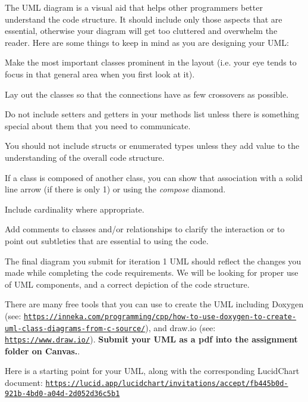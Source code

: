 The U\+ML diagram is a visual aid that helps other programmers better understand the code structure. It should include only those aspects that are essential, otherwise your diagram will get too cluttered and overwhelm the reader. Here are some things to keep in mind as you are designing your U\+ML\+:


\begin{DoxyItemize}
\item Make the most important classes prominent in the layout (i.\+e. your eye tends to focus in that general area when you first look at it).
\item Lay out the classes so that the connections have as few crossovers as possible.
\item Do not include setters and getters in your methods list unless there is something special about them that you need to communicate.
\item You should not include structs or enumerated types unless they add value to the understanding of the overall code structure.
\item If a class is composed of another class, you can show that association with a solid line arrow (if there is only 1) or using the {\itshape compose} diamond.
\item Include cardinality where appropriate.
\item Add comments to classes and/or relationships to clarify the interaction or to point out subtleties that are essential to using the code.
\end{DoxyItemize}

The final diagram you submit for iteration 1 U\+ML should reflect the changes you made while completing the code requirements. We will be looking for proper use of U\+ML components, and a correct depiction of the code structure.

There are many free tools that you can use to create the U\+ML including Doxygen (see\+: \href{https://inneka.com/programming/cpp/how-to-use-doxygen-to-create-uml-class-diagrams-from-c-source/}{\tt https\+://inneka.\+com/programming/cpp/how-\/to-\/use-\/doxygen-\/to-\/create-\/uml-\/class-\/diagrams-\/from-\/c-\/source/}), and draw.\+io (see\+: \href{https://www.draw.io/}{\tt https\+://www.\+draw.\+io/}). {\bfseries Submit your U\+ML as a pdf into the assignment folder on Canvas.}.

Here is a starting point for your U\+ML, along with the corresponding Lucid\+Chart document\+: \href{https://lucid.app/lucidchart/invitations/accept/fb445b0d-921b-4bd0-a04d-2d052d36c5b1}{\tt https\+://lucid.\+app/lucidchart/invitations/accept/fb445b0d-\/921b-\/4bd0-\/a04d-\/2d052d36c5b1}



